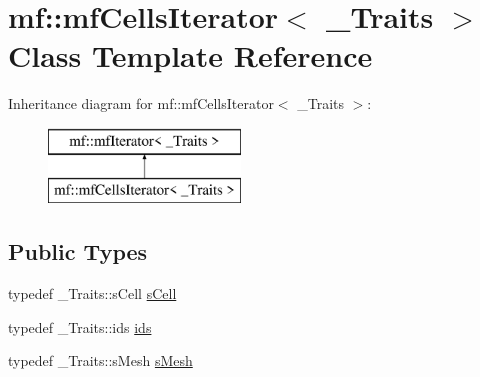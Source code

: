 \hypertarget{classmf_1_1mfCellsIterator}{
\section{mf::mfCellsIterator$<$ \_\-Traits $>$ Class Template Reference}
\label{classmf_1_1mfCellsIterator}
}
Inheritance diagram for mf::mfCellsIterator$<$ \_\-Traits $>$:\begin{figure}[H]
\begin{center}
\leavevmode
\includegraphics[height=2.000000cm]{classmf_1_1mfCellsIterator}
\end{center}
\end{figure}
\subsection*{Public Types}
\begin{DoxyCompactItemize}
\item 
typedef \_\-Traits::sCell \hyperlink{classmf_1_1mfCellsIterator_afe3e76ed6519e2ad74dff562b23aa52f}{sCell}
\item 
typedef \_\-Traits::ids \hyperlink{classmf_1_1mfCellsIterator_a836ea7a8c64a86f414d71c2556969e1c}{ids}
\item 
typedef \_\-Traits::sMesh \hyperlink{classmf_1_1mfCellsIterator_a3f16876b669a93e719af84cdc0c9dad9}{sMesh}
\end{DoxyCompactItemize}
